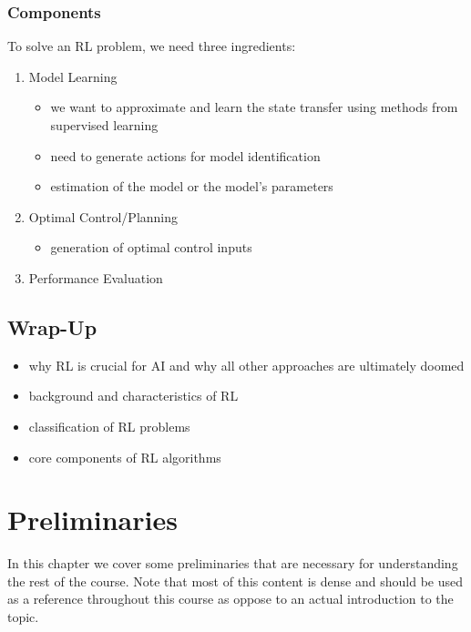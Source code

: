 		\subsection{Components}
			To solve an \ac{RL} problem, we need three ingredients:
			\begin{enumerate}
				\item Model Learning
					\begin{itemize}
						\item we want to approximate and learn the state transfer using methods from supervised learning
						\item need to generate actions for model identification
						\item estimation of the model or the model's parameters
					\end{itemize}
				\item Optimal Control/Planning
					\begin{itemize}
						\item generation of optimal control inputs
					\end{itemize}
				\item Performance Evaluation
			\end{enumerate}

	\section{Wrap-Up}
		\begin{itemize}
			\item why \ac{RL} is crucial for \ac{AI} and why all other approaches are ultimately doomed
			\item background and characteristics of \ac{RL}
			\item classification of \ac{RL} problems
			\item core components of \ac{RL} algorithms
		\end{itemize}

\chapter{Preliminaries}
	In this chapter we cover some preliminaries that are necessary for understanding the rest of the course. Note that most of this content is dense and should be used as a reference throughout this course as oppose to an actual introduction to the topic.

